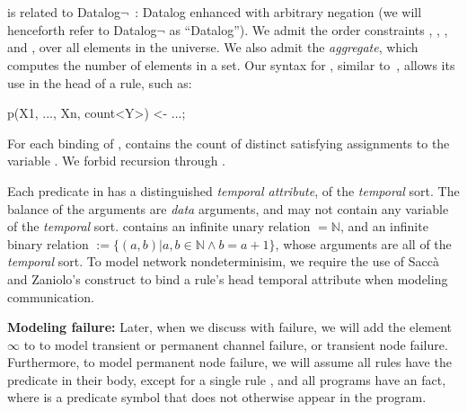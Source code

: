 \section{\large \bf \lang}
\label{sec:slang}

\lang is related to Datalog$\lnot$~\cite{ullmanbook}: Datalog enhanced with arbitrary negation (we will henceforth refer to Datalog$\lnot$ as ``Datalog'').  We admit the order constraints \dedalus{<}, \dedalus{=}, \dedalus{!=}, and \dedalus{<=}, over all elements in the universe.  We also admit the  {\em aggregate}, which computes the number of elements in a set.  Our syntax for , similar to~\cite{datalog-agg}, allows its use in the head of a rule, such as: 

\begin{Dedalus}
p(X1, ..., Xn, count<Y>) <- ...;
\end{Dedalus}

For each binding of ,  contains the count of distinct satisfying assignments to the variable .  
We forbid recursion through .

Each predicate in \lang has a distinguished {\em temporal attribute}, of the {\em temporal} sort.  The balance of the arguments are {\em data} arguments, and may not contain any variable of the {\em temporal} sort.  \lang contains an infinite unary relation  $= \mathbb{N}$, and an infinite binary relation  $:= \{(a,b) | a,b \in \mathbb{N} \land b = a + 1\}$, whose arguments are all of the {\em temporal} sort.  To model network nondeterminisim, we require the use of Sacc\`{a} and Zaniolo's  construct to bind a rule's head temporal attribute when modeling communication.

{\bf Modeling failure:}  Later, when we discuss \lang with failure, we will add the element $\infty$ to  to model transient or permanent channel failure, or transient node failure.  Furthermore, to model permanent node failure, we will assume all rules have the  predicate in their body, except for a single rule , and all programs have an  fact, where  is a predicate symbol that does not otherwise appear in the program.    

